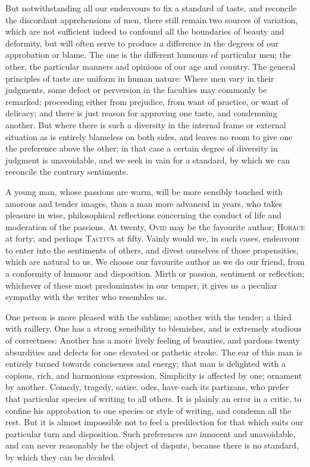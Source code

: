 But notwithstanding all our endeavours to fix a standard of taste, and
reconcile the discordant apprehensions of men, there still remain two
sources of variation, which are not sufficient indeed to confound all
the boundaries of beauty and deformity, but will often serve to
produce a difference in the degrees of our approbation or blame. The
one is the different humours of particular men; the other, the
particular manners and opinions of our age and country. The general
principles of taste are uniform in human nature: Where men vary in
their judgments, some defect or perversion in the faculties may
commonly be remarked; proceeding either from prejudice, from want of
practice, or want of delicacy; and there is just reason for approving
one taste, and condemning another. But where there is such a diversity
in the internal frame or external situation as is entirely blameless
on both sides, and leaves no room to give one the preference above the
other; in that case a certain degree of diversity in judgment is
unavoidable, and we seek in vain  for a standard, by which
we can reconcile the contrary sentiments.

A young man, whose passions are warm, will be more sensibly touched
with amorous and tender images, than a man more advanced in years, who
takes pleasure in wise, philosophical reflections concerning the
conduct of life and moderation of the passions. At twenty,
\textsc{Ovid} may be the favourite author; \textsc{Horace} at forty;
and perhaps \textsc{Tacitus} at fifty. Vainly would we, in such cases,
endeavour to enter into the sentiments of others, and divest ourselves
of those propensities, which are natural to us. We choose our
favourite author as we do our friend, from a conformity of humour and
disposition. Mirth or passion, sentiment or reflection; whichever of
these most predominates in our temper, it gives us a peculiar sympathy
with the writer who resembles us.

One person is more pleased with the sublime; another with the tender;
a third with raillery. One has a strong sensibility to blemishes, and
is extremely studious of correctness: Another has a more lively
feeling of beauties, and pardons twenty absurdities and defects for
one elevated or pathetic stroke. The ear of this man is entirely
turned towards conciseness and energy; that man is delighted with a
copious, rich, and harmonious expression. Simplicity is affected by
one; ornament by another. Comedy, tragedy, satire, odes, have each its
partizans, who prefer that particular species of writing to all
others. It is plainly an error in a critic, to confine his approbation
to one species or style of writing, and condemn all the rest. But it
is almost impossible not to feel a predilection for that which suits
our particular turn and disposition. Such preferences are innocent and
unavoidable, and can never reasonably be the object of dispute,
because there is no standard, by which they can be decided.

